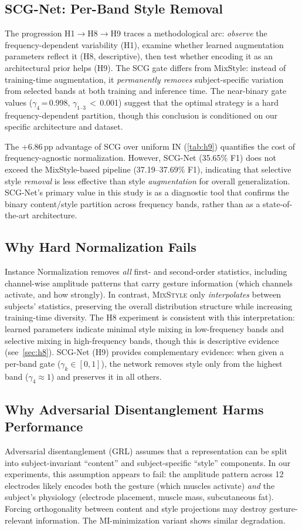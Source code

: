 \documentclass[conference]{IEEEtran}
\newcommand{\pp}{\,pp}
\newcommand{\mixstyle}{\textsc{MixStyle}}
\begin{document}
\subsection{SCG-Net: Per-Band Style Removal}
The progression H1$\to$H8$\to$H9 traces a methodological arc: \emph{observe} the frequency-dependent variability (H1), examine whether learned augmentation parameters reflect it (H8, descriptive), then test whether encoding it as an architectural prior helps (H9).
The SCG gate differs from MixStyle: instead of training-time augmentation, it \emph{permanently removes} subject-specific variation from selected bands at both training and inference time.
The near-binary gate values ($\gamma_4$\,=\,0.998, $\gamma_{1\text{--}3}$\,$<$\,0.001) suggest that the optimal strategy is a hard frequency-dependent partition, though this conclusion is conditioned on our specific architecture and dataset.

The +6.86\pp{} advantage of SCG over uniform IN (\cref{tab:h9}) quantifies the cost of frequency-agnostic normalization.
However, SCG-Net (35.65\% F1) does not exceed the MixStyle-based pipeline (37.19--37.69\% F1), indicating that selective style \emph{removal} is less effective than style \emph{augmentation} for overall generalization.
SCG-Net's primary value in this study is as a diagnostic tool that confirms the binary content/style partition across frequency bands, rather than as a state-of-the-art architecture.

\subsection{Why Hard Normalization Fails}
Instance Normalization removes \emph{all} first- and second-order statistics, including channel-wise amplitude patterns that carry gesture information (which channels activate, and how strongly).
In contrast, \mixstyle{} only \emph{interpolates} between subjects' statistics, preserving the overall distribution structure while increasing training-time diversity.
The H8 experiment is consistent with this interpretation: learned parameters indicate minimal style mixing in low-frequency bands and selective mixing in high-frequency bands, though this is descriptive evidence (see~\cref{sec:h8}).
SCG-Net (H9) provides complementary evidence: when given a per-band gate ($\gamma_k \in [0,1]$), the network removes style only from the highest band ($\gamma_4 \approx 1$) and preserves it in all others.

\subsection{Why Adversarial Disentanglement Harms Performance}
Adversarial disentanglement (GRL) assumes that a representation can be split into subject-invariant ``content'' and subject-specific ``style'' components.
In our experiments, this assumption appears to fail: the amplitude pattern across 12 electrodes likely encodes both the gesture (which muscles activate) \emph{and} the subject's physiology (electrode placement, muscle mass, subcutaneous fat).
Forcing orthogonality between content and style projections may destroy gesture-relevant information.
The MI-minimization variant shows similar degradation.
\end{document}
